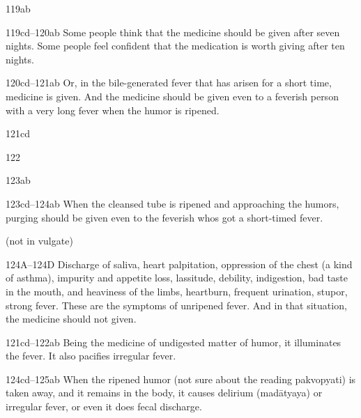 \begin{translation}
   \item[119ab]  
    
    \item[119cd--120ab]  Some people think that the medicine should be given 
after
    seven nights. Some people feel confident that the medication is worth
    giving after ten nights.
    
    \item[120cd--121ab]  Or, in the bile-generated fever that has arisen for a 
short
    time, medicine is given. And the medicine should be given even to a
    feverish person with a very long fever when the humor is ripened.
    
    
   \item[121cd]  
    
   \item[122]  
    
   \item[123ab]  
    
    \item[123cd--124ab]  When the cleansed tube is ripened and approaching the
    humors, purging should be given even to the feverish
    who\textquotesingle s got a short-timed fever.
    
    (not in vulgate)
    
    \item[124A--124D]  Discharge of saliva, heart palpitation, oppression of the
    chest (a kind of asthma), impurity and appetite loss, lassitude,
    debility, indigestion, bad taste in the mouth, and heaviness of the
    limbs, heartburn, frequent urination, stupor, strong fever. These are
    the symptoms of unripened fever. And in that situation, the medicine
    should not given.
    
    
    \item[121cd--122ab]  Being the medicine of undigested matter of 
    humor, it illuminates the fever. It also pacifies irregular
    fever.
    
    \item[124cd--125ab]  When the ripened humor (not sure about the reading
    pakvopyati) is taken away, and it remains in the body, it causes
    delirium (madātyaya) or irregular fever, or even it does fecal
    discharge.
    

\end{translation}
